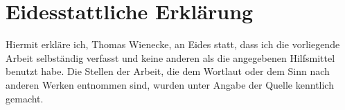 \chapter*{Eidesstattliche Erklärung}
\noindent Hiermit erkläre ich, Thomas Wienecke, an Eides statt, dass ich die
vorliegende Arbeit selbständig verfasst und keine anderen als die angegebenen
Hilfsmittel benutzt habe. Die Stellen der Arbeit, die dem Wortlaut oder dem
Sinn nach anderen Werken entnommen sind, wurden unter Angabe der Quelle
kenntlich gemacht.
\vspace{10pt}\\
\begin{figure}[h!]
    \begin{center}
    \end{center}
\end{figure}
